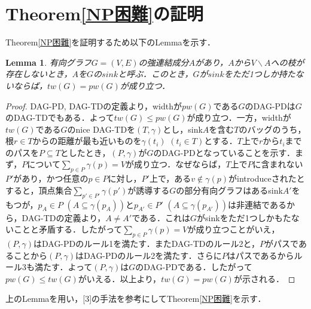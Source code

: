 \documentclass[master]{kuisthesis}		%
\theoremstyle{plain}
\newtheorem{lemma}{Lemma}
\theoremstyle{definition}
\begin{document}
\section{Theorem\ref{NP困難}の証明}
Theorem\ref{NP困難}を証明するため以下のLemmaを示す．

\begin{lemma}\label{sink}
    有向グラフ$G=(V, E)$の強連結成分$A$があり，$A$から$V \backslash A$への枝が存在しないとき，$A$を$G$の$sink$と呼ぶ．このとき，$G$が$sink$をただ1つしか持たないならば，$tw(G) = pw(G)$が成り立つ．
\end{lemma}


\begin{proof}
    DAG-PD, DAG-TDの定義より，widthが$pw(G)$である$G$のDAG-PDは$G$のDAG-TDでもある．よって$tw(G) \leq pw(G)$が成り立つ．一方，widthが$tw(G)$である$G$のnice DAG-TDを$(T, \gamma)$とし，sink$A$を含む$T$のバッグのうち，根$r \in T$からの距離が最も近いものを$\gamma(t_i)$ $(t_i \in T)$とする．$T$上で$r$から$t_i$までのパスを$P \subseteq T$としたとき，$(P, \gamma)$が$G$のDAG-PDとなっていることを示す．まず，$P$について$\sum_{p \in P} \gamma(p) = V$が成り立つ．なぜならば，$T$上で$P$に含まれない$P'$があり，かつ任意の$p \in P$に対し，$P'$上で，ある$v \notin \gamma(p)$がintroduceされたとすると，頂点集合$\sum_{p' \in P'} \gamma(p')$が誘導する$G$の部分有向グラフはあるsink$A'$をもつが，$p_A \in P$ $(A \subseteq \gamma(p_A))$と$p_{A'} \in P'$ $(A \subseteq \gamma(p_{A'}))$は非連結であるから，DAG-TDの定義より，$A \neq A'$である．これは$G$がsinkをただ1つしかもたないことと矛盾する．したがって$\sum_{p \in P} \gamma(p) = V$が成り立つことがいえ，$(P, \gamma)$はDAG-PDのルール1を満たす．またDAG-TDのルール2と，$P$がパスであることから$(P, \gamma)$はDAG-PDのルール2を満たす．さらに$P$はパスであるからルール3も満たす．よって$(P, \gamma)$は$G$のDAG-PDである．したがって$pw(G) \leq tw(G)$がいえる．以上より，$tw(G) = pw(G)$が示される．
\end{proof}


上のLemmaを用い，[3]の手法を参考にしてTheorem\ref{NP困難}を示す．
\end{document}
